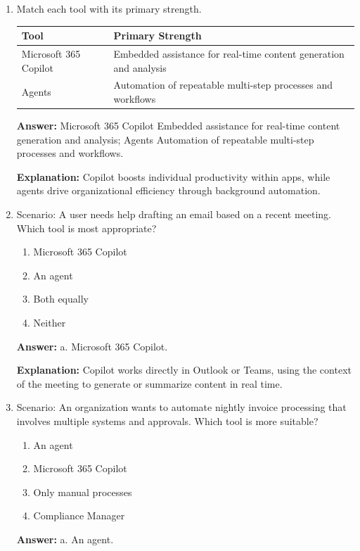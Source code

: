 \documentclass[10pt]{article}
\begin{document}
\begin{enumerate}[leftmargin=*]
\textbf{Explanation:} They can be triggered by events or schedules and connect across applications for structured workflows.

\item Match each tool with its primary strength.

\begin{center}
\begin{tabular}{>{\raggedright\arraybackslash}p{} >{\raggedright\arraybackslash}p{}}
\toprule
\textbf{Tool} & \textbf{Primary Strength} \\
\midrule
Microsoft 365 Copilot & Embedded assistance for real-time content generation and analysis \\
Agents & Automation of repeatable multi-step processes and workflows \\
\bottomrule
\end{tabular}
\end{center}

\textbf{Answer:} Microsoft 365 Copilot \textrightarrow{} Embedded assistance for real-time content generation and analysis; Agents \textrightarrow{} Automation of repeatable multi-step processes and workflows.

\textbf{Explanation:} Copilot boosts individual productivity within apps, while agents drive organizational efficiency through background automation.

\item Scenario: A user needs help drafting an email based on a recent meeting. Which tool is most appropriate?
\begin{enumerate}[label=\alph*., leftmargin=1.5em]
\item Microsoft 365 Copilot
\item An agent
\item Both equally
\item Neither
\end{enumerate}
\textbf{Answer:} a. Microsoft 365 Copilot.

\textbf{Explanation:} Copilot works directly in Outlook or Teams, using the context of the meeting to generate or summarize content in real time.

\item Scenario: An organization wants to automate nightly invoice processing that involves multiple systems and approvals. Which tool is more suitable?
\begin{enumerate}[label=\alph*., leftmargin=1.5em]
\item An agent
\item Microsoft 365 Copilot
\item Only manual processes
\item Compliance Manager
\end{enumerate}
\textbf{Answer:} a. An agent.


\end{enumerate}
\end{document}
